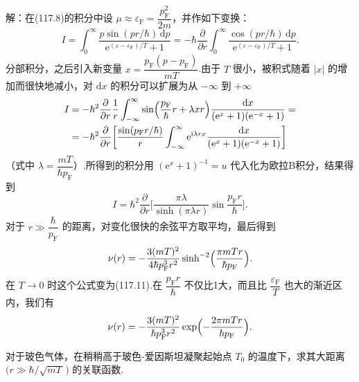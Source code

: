\begin{xiti}
解：在(117.8)的积分中设 $\mu\approx\varepsilon_{\mathrm F}=\dfrac{p^{2}_{\mathrm F}}{2m}$，并作如下变换：
\begin{equation*}
  I=\int_{0}^{\infty}
  \frac{p\sin(pr/\hbar)\,\mathrm{d}p}
  {\mathrm{e}^{(\varepsilon-\varepsilon_{\mathrm F})/T}+1}
  =-\hbar\frac{\partial}{\partial r}\int_{0}^{\infty}
  \frac{\cos(pr/\hbar)\,\mathrm{d}p}
  {\mathrm{e}^{(\varepsilon-\varepsilon_{\mathrm F})/T}+1}.
\end{equation*}
分部积分，之后引入新变量 $x=\dfrac{p_{\mathrm F}(p-p_{\mathrm F})}{mT}$.由于 $T$
很小，被积式随着 $|x|$ 的增加而很快地减小，对 $\mathrm{d}x$ 的积分可以扩展为从 $-\infty$ 到
$+\infty$
\begin{equation*}
\begin{aligned}
  I&=-\hbar^{2}\frac{\partial}{\partial r}\frac{1}{r}
  \int_{-\infty}^{\infty}
  \sin\Bigl(\frac{p_{\mathrm F}}{\hbar}r+\lambda xr\Bigr)
  \frac{\mathrm{d}x}{(\mathrm{e}^{x}+1)(\mathrm{e}^{-x}+1)}=\\
  &=-\hbar^{2}\frac{\partial}{\partial r}\biggl[
  \frac{\sin(p_{\mathrm F}r/\hbar)}{r}
  \int_{-\infty}^{\infty}\mathrm{e}^{\mathrm{i}\lambda rx}
  \frac{\mathrm{d}x}{(\mathrm{e}^{x}+1)(\mathrm{e}^{-x}+1)}\biggr]
\end{aligned}
\end{equation*}
（式中 $\lambda=\dfrac{mT}{\hbar p_{\mathrm F}}$）.所得到的积分用
$(\mathrm{e}^{x}+1)^{-1}=u$ 代入化为欧拉B积分，结果得到
\begin{equation*}
  I=\hbar^{2}\frac{\partial}{\partial r}\biggl[
  \frac{\pi\lambda}{\sinh(\pi\lambda r)}
  \sin\frac{p_{\mathrm F}r}{\hbar}\biggr].
\end{equation*}
对于 $r\gg\dfrac{\hbar}{p_{\mathrm F}}$ 的距离，对变化很快的余弦平方取平均，最后得到
\begin{equation*}
  \nu(r)=-\frac{3(mT)^{2}}{4\hbar p^{3}_{\mathrm F}r^{2}}
  \sinh^{-2}\Bigl(\frac{\pi mTr}{\hbar p_{\mathrm F}}\Bigr).
\end{equation*}
在 $T\to0$ 时这个公式变为(117.11).在 $\dfrac{p_{\mathrm F}r}{\hbar}$ 不仅比1大，而且比
$\dfrac{\varepsilon_{\mathrm F}}{T}$ 也大的渐近区内，我们有
\begin{equation*}
  \nu(r)=-\frac{3(mT)^{2}}{\hbar p^{3}_{\mathrm F}r^{2}}
  \exp\Bigl(-\frac{2\pi mTr}{\hbar p_{\mathrm F}}\Bigr).
\end{equation*}

\quad 对于玻色气体，在稍稍高于玻色-爱因斯坦凝聚起始点 $T_{0}$
的温度下，求其大距离 $\bigl(r\gg\hbar/\sqrt{mT}\,\bigr)$ 的关联函数.


\end{xiti}
